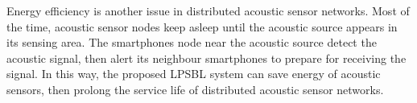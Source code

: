 Energy efficiency is another issue in distributed acoustic sensor networks.
Most of the time, acoustic sensor nodes keep asleep until the acoustic source appears in its sensing area.  
The smartphones node near the acoustic source detect the acoustic signal, then alert its neighbour smartphones to prepare for receiving the signal.
In this way, the proposed LPSBL system can save energy of acoustic sensors, then prolong the service life of distributed acoustic sensor networks.








